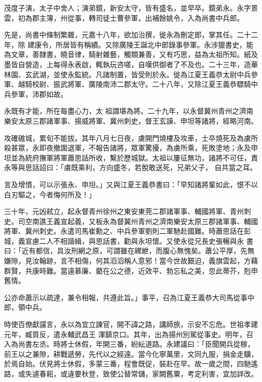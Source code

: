 \begin{pinyinscope}
 茂度子演，太子中舍人；演弟鏡，新安太守，皆有盛名，並早卒。鏡弟永。永字景雲，初為郡主簿，州從事，轉司徒士曹參軍，出補餘姚令，入為尚書中兵郎。



 先是，尚書中條制繁雜，元嘉十八年，欲加治撰，徙永為刪定郎，掌其任。二十二年，除
 建康令，所居皆有稱績。又除廣陵王誕北中郎錄事參軍。永涉獵書史，能為文章，善隸書，曉音律，騎射雜藝，觸類兼善，又有巧思，益為太祖所知。紙及墨皆自營造，上每得永表啟，輒執玩咨嗟，自嘆供御者了不及也。二十三年，造華林園、玄武湖，並使永監統。凡諸制置，皆受則於永。徙為江夏王義恭太尉中兵參軍、越騎校尉、振武將軍、廣陵南沛二郡太守。二十八年，又除江夏王義恭驃騎中兵參軍，沛郡如故。



 永既有才能，所在每盡心力，太
 祖謂堪為將。二十九年，以永督冀州青州之濟南樂安太原三郡諸軍事、揚威將軍、冀州刺史，督王玄謨、申坦等諸將，經略河南。



 攻確磝城，累旬不能拔。其年八月七日夜，虜開門燒樓及攻車，士卒燒死及為虜所殺甚眾，永即夜撤圍退軍，不報告諸將，眾軍驚擾，為虜所乘，死敗塗地；永及申坦並為統府撫軍將軍蕭思話所收，繫於歷城獄。太祖以屢征無功，諸將不可任，責永等與思話詔曰：「虜既乘利，方向盛冬，若脫敢送死，兄弟父子，
 自共當之耳。



 言及增憤，可以示張永、申坦。」又與江夏王義恭書曰：「早知諸將輩如此，恨不以白刃驅之，今者悔何所及！」



 三十年，元凶弒立，起永督青州徐州之東安東莞二郡諸軍事、輔國將軍、青州刺史。司空南譙王義宣起義，又板永為督冀州青州之濟南樂安太原三郡諸軍事、輔國將軍、冀州刺史。永遣司馬崔勳之、中兵參軍劉則二軍馳赴國難。時蕭思話在彭城，義宣慮二人不相諧緝，與思話書，勸與永坦懷。又使永從兄長史張暢與永
 書曰：「近有都信，具汝刑網之原，可謂雖在縲紲，而腹心無愧矣。蕭公平厚，先無嫌隙，見汝翰跡，言不相傷，何其滔滔稱人意邪！當今世故艱迫，義旗雲起，方藉群賢，共康時難。當遠慕廉、藺在公之德，近效平、勃忘私之美，忽此蒂芥，剋申舊情。



 公亦命蕭示以疏達，兼令相報，共遵此旨。」事平，召為江夏王義恭大司馬從事中郎，領中兵。



 時使百僚獻讜言，永以為宜立諫官，開不諱之路，講師旅，示安不忘危。世祖孝建元年，臧質反，遣永輔武昌王
 渾鎮京口。其年，出為揚州別駕從事史。明年，召入為尚書左丞。時將士休假，年開三番，紛紜道路。永建議曰：「臣聞開兵從稼，前王以之兼隙，耕戰遞勞，先代以之經遠。當今化寧萬里，文同九服，捐金走驥，於焉自始。伏見將士休假，多蒙三番，程會既促，裝赴在早。故一歲之間，四馳遙路，或失遽春耜，或違要秋登，致使公替常儲，家闕舊粟，考定利害，宜加詳改。




\end{pinyinscope}
